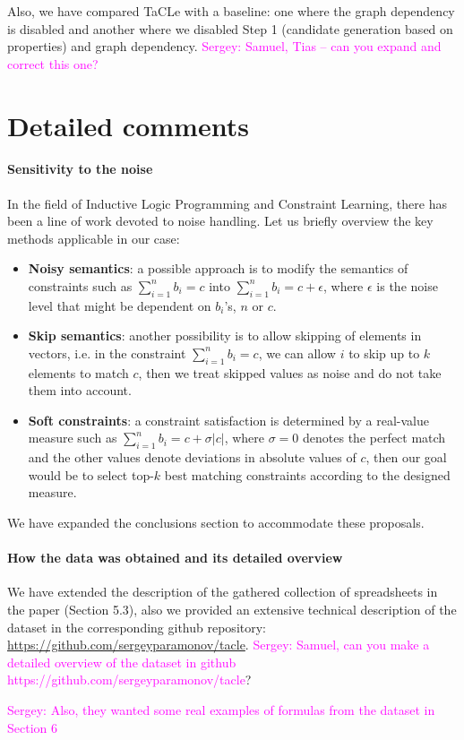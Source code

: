 \documentclass{article}
\newcommand{\sergey}[1]{\textcolor{magenta}{{\sc Sergey:} #1}\xspace}
\begin{document}
Also, we have compared TaCLe with a baseline: one where the graph dependency is disabled and another where we disabled Step 1 (candidate generation based on properties) and graph dependency. \sergey{Samuel, Tias -- can you expand and correct this one?}

\section{Detailed comments}

\paragraph{Sensitivity to the noise}
In the field of Inductive Logic Programming and Constraint Learning, there has been a line of work devoted to noise handling. Let us briefly overview the key methods applicable in our case:
\begin{itemize}
  \item \textbf{Noisy semantics}: a possible approach is to modify the semantics of constraints such as $\sum_{i=1}^n b_i = c$ into $\sum_{i=1}^n b_i = c + \epsilon$, where $\epsilon$ is the noise level that might be dependent on $b_i$'s, $n$ or $c$.
  \item \textbf{Skip semantics}: another possibility is to allow skipping of elements in vectors, i.e. in the constraint  $\sum_{i=1}^n b_i = c$, we can allow $i$ to skip up to $k$ elements to match $c$, then we treat skipped values as noise and do not take them into account.
  \item \textbf{Soft constraints}: a constraint satisfaction is determined by a real-value measure such as $\sum_{i=1}^n b_i = c + \sigma|c|$, where $\sigma=0$ denotes the perfect match and the other values denote deviations in absolute values of $c$, then our goal would be to select top-$k$ best matching constraints according to the designed measure.
\end{itemize}

We have expanded the conclusions section to accommodate these proposals.


\paragraph{How the data was obtained and its detailed overview}
We have extended the description of the gathered collection of spreadsheets in the paper (Section 5.3), also we provided an extensive technical description of the dataset in the corresponding github repository: \url{https://github.com/sergeyparamonov/tacle}.
\sergey{Samuel, can you make a detailed overview of the dataset in github https://github.com/sergeyparamonov/tacle}?

\sergey{Also, they wanted some real examples of formulas from the dataset in Section 6}
\end{document}
